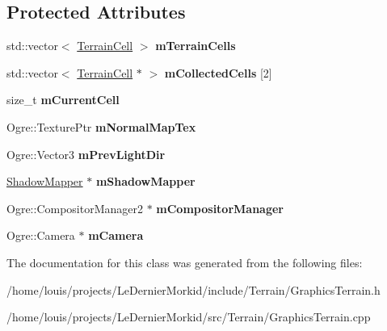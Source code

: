 \subsection*{Protected Attributes}
\begin{DoxyCompactItemize}
\item 
\mbox{\label{class_graphics_terrain_a7c44ecd3372c8fc18414b45e48cd08b4}} 
std\+::vector$<$ \hyperlink{class_terrain_cell}{Terrain\+Cell} $>$ {\bfseries m\+Terrain\+Cells}
\item 
\mbox{\label{class_graphics_terrain_a99431a62bb984a130be408d8e198f74e}} 
std\+::vector$<$ \hyperlink{class_terrain_cell}{Terrain\+Cell} $\ast$ $>$ {\bfseries m\+Collected\+Cells} \mbox{[}2\mbox{]}
\item 
\mbox{\label{class_graphics_terrain_a88383b43425ca55d6fbb5ef1e20302a3}} 
size\+\_\+t {\bfseries m\+Current\+Cell}
\item 
\mbox{\label{class_graphics_terrain_a7f43e03a4fe4c0811648b299397dc4da}} 
Ogre\+::\+Texture\+Ptr {\bfseries m\+Normal\+Map\+Tex}
\item 
\mbox{\label{class_graphics_terrain_aea152cbc9b9a33faed38e5fad97aa793}} 
Ogre\+::\+Vector3 {\bfseries m\+Prev\+Light\+Dir}
\item 
\mbox{\label{class_graphics_terrain_aeb60344dfe412f9241348c96fa29f9ec}} 
\hyperlink{class_shadow_mapper}{Shadow\+Mapper} $\ast$ {\bfseries m\+Shadow\+Mapper}
\item 
\mbox{\label{class_graphics_terrain_a80d73f6cdce5b43211188f6bda9fc633}} 
Ogre\+::\+Compositor\+Manager2 $\ast$ {\bfseries m\+Compositor\+Manager}
\item 
\mbox{\label{class_graphics_terrain_afd48f23d6b969ccef286bb1aec437340}} 
Ogre\+::\+Camera $\ast$ {\bfseries m\+Camera}
\end{DoxyCompactItemize}


The documentation for this class was generated from the following files\+:\begin{DoxyCompactItemize}
\item 
/home/louis/projects/\+Le\+Dernier\+Morkid/include/\+Terrain/Graphics\+Terrain.\+h\item 
/home/louis/projects/\+Le\+Dernier\+Morkid/src/\+Terrain/Graphics\+Terrain.\+cpp\end{DoxyCompactItemize}
